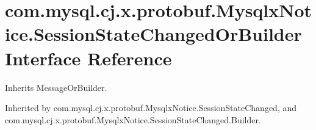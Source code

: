 \hypertarget{interfacecom_1_1mysql_1_1cj_1_1x_1_1protobuf_1_1_mysqlx_notice_1_1_session_state_changed_or_builder}{}\section{com.\+mysql.\+cj.\+x.\+protobuf.\+Mysqlx\+Notice.\+Session\+State\+Changed\+Or\+Builder Interface Reference}
\label{interfacecom_1_1mysql_1_1cj_1_1x_1_1protobuf_1_1_mysqlx_notice_1_1_session_state_changed_or_builder}


Inherits Message\+Or\+Builder.



Inherited by com.\+mysql.\+cj.\+x.\+protobuf.\+Mysqlx\+Notice.\+Session\+State\+Changed, and com.\+mysql.\+cj.\+x.\+protobuf.\+Mysqlx\+Notice.\+Session\+State\+Changed.\+Builder.

